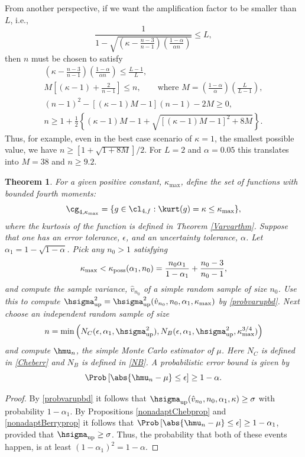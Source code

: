 \documentclass[12pt]{amsart}
\newcommand{\hv}{\hat{v}}
\newtheorem{theorem}{Theorem}
\begin{document}
From another perspective, if we want the amplification factor to be smaller than $L$, i.e.,
\[
\frac{1}{1 - \sqrt{ \left ( \kappa  - \frac{n-3}{n-1}\right)\left(\frac{1-\alpha}{\alpha n }\right)}} \le L,
\]
then $n$ must be chosen to satisfy
\begin{gather*}
\left(\kappa  - \frac{n-3}{n-1}\right)\left(\frac{1-\alpha}{\alpha n }\right) \le \frac{L-1}{L}, \\
M\left[(\kappa-1)  + \frac{2}{n-1}\right] \le n, \qquad \text{where } M= \left(\frac{1-\alpha}{\alpha}\right)  \left(\frac{L}{L-1} \right), \\
(n-1)^2 - [(\kappa-1)M -1](n-1)  - 2 M \ge 0, \\
n \ge 1 + \frac{1}{2} \left\{ (\kappa-1)M -1 + \sqrt{\left[(\kappa-1)M -1\right]^2 + 8 M}\right\}.
\end{gather*}
Thus, for example, even in the best case scenario of $\kappa=1$, the smallest possible value, we have $n \ge [1 + \sqrt{1 + 8 M}]/2$.  For $L=2$ and $\alpha=0.05$ this translates into $M=38$ and $n \ge 9.2$.

\begin{theorem} \label{mainadaptthm} For a given positive constant, $\kappa_{\max}$, define the set of functions with bounded fourth moments:
\[
\cg_{4,\kappa_{\max}}= \{g \in \cl_{4,f} : \kurt(g)= \kappa \le \kappa_{\max} \},
\]
where the kurtosis of the function is defined in Theorem \ref{Varvarthm}.
Suppose that one has an error tolerance, $\epsilon$, and an uncertainty tolerance, $\alpha$. Let $\alpha_1 = 1 - \sqrt{1 - \alpha}$.  Pick any $n_0>1$ satisfying
\[
\kappa_{\max} < \kappa_{\text{\rm poss}}(\alpha_1,n_0)  = \frac{n_0 \alpha_1}{1-\alpha_1} + \frac{n_0-3}{n_0-1},
\]
and compute the sample variance, $\hv_{n_0}$ of a simple random sample of size $n_0$.   Use this to compute $\hsigma^2_{\text{\rm up}} = \hsigma^2_{\text{\rm up}}(\hv_{n_0},n_0,\alpha_1,\kappa_{\max})$ by \eqref{probvarupbd}.  Next choose an independent random sample of size
\[
n = \min\left( N_C(\epsilon,\alpha_1,\hsigma^2_{\text{\rm up}}), N_B(\epsilon,\alpha_1,\hsigma^2_{\text{\rm up}},\kappa_{\max}^{3/4}) \right)
\]
and compute $\hmu_n$, the simple Monte Carlo estimator of $\mu$.  Here $N_C$ is defined in \eqref{Cheberr} and  $N_B$ is defined in \eqref{NB}.  A probabilistic error bound is given by
\[
\Prob\left[\abs{\hmu_n-\mu} \le \epsilon \right] \geq 1-\alpha.
\]
\end{theorem}
\begin{proof}
By \eqref{probvarupbd} it follows that $\hsigma_{\text{up}}(\hv_{n_0},n_0,\alpha_1,\kappa)  \ge \sigma$ with probability $1-\alpha_1$.  By Propositions  \ref{nonadaptChebprop} and \ref{nonadaptBerryprop} it follows that  $\Prob\left[\abs{\hmu_n-\mu} \le \epsilon \right] \geq 1-\alpha_1$, provided that $\hsigma_{\text{up}}  \ge \sigma$.  Thus, the probability that both of these events happen, is at least $(1-\alpha_1)^2=1-\alpha$.
\end{proof}
\end{document}
